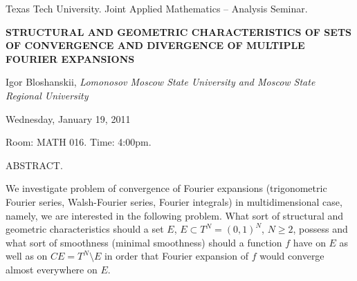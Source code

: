 \documentclass[oneside]{amsart}
\newcommand{\talktitle}{Structural and Geometric Characteristics of Sets of Convergence and Divergence of Multiple Fourier Expansions}
\newcommand{\talkspeaker}{{\sc Igor Bloshanskii}, \textit{Lomonosov Moscow State University and Moscow State Regional University}}
\newcommand{\talkdate}{Wednesday, January 19, 2011}
\newcommand{\talkabstract}{
We investigate problem of convergence of Fourier expansions
(trigonometric Fourier series, Walsh-Fourier series, Fourier integrals) in multidimensional
case, namely, we are interested in the following problem. What sort of structural and geometric characteristics should a set $E$, $E \subset T^N=(0,1)^N$, $N\ge 2$, possess and what sort of smoothness (minimal smoothness) should a function $f$ have on $E$ as well as on $CE=T^N\setminus E$ in order that Fourier expansion of $f$  would converge almost everywhere on $E$.
}
\begin{document}
\thispagestyle{empty}

\begin{center}
Texas Tech University.  Joint Applied Mathematics -- Analysis Seminar.

\end{center}

\begin{center}

\textbf{\LARGE {\uppercase{\talktitle}} }

\talkspeaker

\talkdate

Room: MATH 016.  Time: 4:00pm.

\end{center}

ABSTRACT.
\talkabstract
\end{document}
